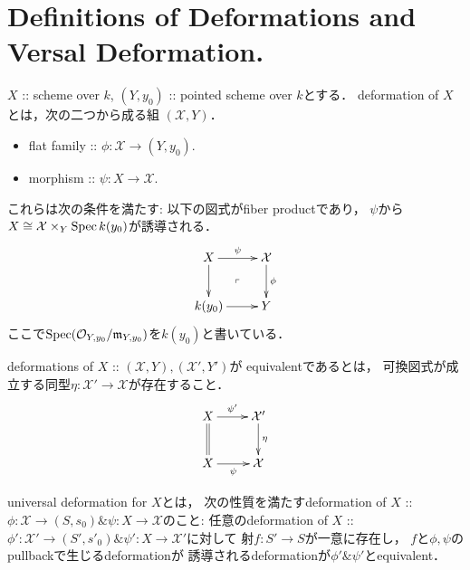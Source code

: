 \documentclass[a4paper]{jsarticle}
\newcommand{\famX}{\mathcal{X}}
\begin{document}
\section{Definitions of Deformations and Versal Deformation.}
    \begin{Def}
        $X$ :: scheme over $k$,
        $(Y, y_0)$ :: pointed scheme over $k$とする．
        deformation of $X$とは，次の二つから成る組 $(\famX, Y)$．
        \begin{itemize}
            \item flat family :: $\phi: \famX \to (Y, y_0)$.
            \item morphism :: $\psi: X \to \famX$.
        \end{itemize}
        これらは次の条件を満たす:
        以下の図式がfiber productであり，
        $\psi$から$X \iso \famX \times_{Y} \Spec k(y_0)$が誘導される．
        \[\vcenter{\xymatrix{
            X \ar[r]^-{\psi} \ar[d]& \famX \ar[d]^-{\phi} \\
            k(y_0) \ar[r]& Y
            \ar@{}[lu]|{\ulcorner}
        }}\]
        ここで$\operatorname{Spec} (\mathcal{O}_{Y, y_0}/\mathfrak{m}_{Y, y_0})$を$k(y_0)$と書いている．

        deformations of $X$ :: $(\famX, Y), (\famX', Y')$が
        equivalentであるとは，
        可換図式が成立する同型$\eta: \famX' \to \famX$が存在すること．
        \[\xymatrix{
            X \ar@{=}[d]\ar[r]^-{\psi'}& \famX' \ar[d]^-{\eta}\\
            X \ar[r]_-{\psi}& \famX
        }\]
    \end{Def}

    \begin{Def}
        universal deformation for $X$とは，
        次の性質を満たすdeformation of $X$ ::
        $\phi: \famX \to (S, s_0) \& \psi: X \to \famX$のこと:
        任意のdeformation of $X$ ::
        $\phi': \famX' \to (S', s'_0) \& \psi': X \to \famX'$に対して
        射$f: S' \to S$が一意に存在し，
        $f$と$\phi, \psi$のpullbackで生じるdeformationが
        誘導されるdeformationが$\phi' \& \psi'$とequivalent．
    \end{Def}
\end{document}
